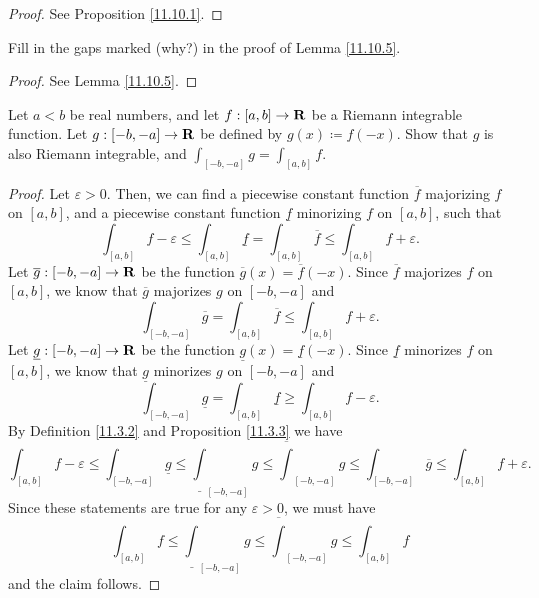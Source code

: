\begin{proof}
    See Proposition \ref{11.10.1}.
\end{proof}

\begin{exercise}\label{ex 11.10.2}
    Fill in the gaps marked (why?) in the proof of Lemma \ref{11.10.5}.
\end{exercise}

\begin{proof}
    See Lemma \ref{11.10.5}.
\end{proof}

\begin{exercise}\label{ex 11.10.3}
    Let \(a < b\) be real numbers, and let \(f : [a, b] \to \mathbf{R}\) be a Riemann integrable function.
    Let \(g : [-b, -a] \to \mathbf{R}\) be defined by \(g(x) \coloneqq f(-x)\).
    Show that \(g\) is also Riemann integrable, and \(\int_{[-b, -a]} g = \int_{[a, b]} f\).
\end{exercise}

\begin{proof}
    Let \(\varepsilon > 0\).
    Then, we can find a piecewise constant function \(\overline{f}\) majorizing \(f\) on \([a, b]\), and a piecewise constant function \(\underline{f}\) minorizing \(f\) on \([a, b]\), such that
    \[
        \int_{[a, b]} f - \varepsilon \leq \int_{[a, b]} \underline{f} = \int_{[a, b]} \overline{f} \leq \int_{[a, b]} f + \varepsilon.
    \]
    Let \(\overline{g} : [-b, -a] \to \mathbf{R}\) be the function \(\overline{g}(x) = \overline{f}(-x)\).
    Since \(\overline{f}\) majorizes \(f\) on \([a, b]\), we know that \(\overline{g}\) majorizes \(g\) on \([-b, -a]\) and
    \[
        \int_{[-b, -a]} \overline{g} = \int_{[a, b]} \overline{f} \leq \int_{[a, b]} f + \varepsilon.
    \]
    Let \(\underline{g} : [-b, -a] \to \mathbf{R}\) be the function \(\underline{g}(x) = \underline{f}(-x)\).
    Since \(\underline{f}\) minorizes \(f\) on \([a, b]\), we know that \(\underline{g}\) minorizes \(g\) on \([-b, -a]\) and
    \[
        \int_{[-b, -a]} \underline{g} = \int_{[a, b]} \underline{f} \geq \int_{[a, b]} f - \varepsilon.
    \]
    By Definition \ref{11.3.2} and Proposition \ref{11.3.3} we have
    \[
        \int_{[a, b]} f - \varepsilon \leq \int_{[-b, -a]} \underline{g} \leq \underline{\int}_{[-b, -a]} g \leq \overline{\int}_{[-b, -a]} g \leq \int_{[-b, -a]} \overline{g} \leq \int_{[a, b]} f + \varepsilon.
    \]
    Since these statements are true for any \(\varepsilon > 0\), we must have
    \[
        \int_{[a, b]} f \leq \underline{\int}_{[-b, -a]} g \leq \overline{\int}_{[-b, -a]} g \leq \int_{[a, b]} f
    \]
    and the claim follows.
\end{proof}

